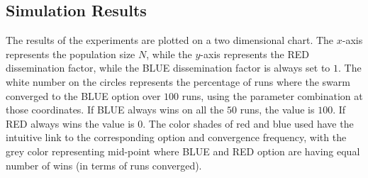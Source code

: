 \documentclass[sigconf]{acmart}
\begin{document}
\subsection{Simulation Results}

The results of the experiments are plotted on a two dimensional chart. The $x$-axis represents the population size $N$, while the $y$-axis represents the RED dissemination factor, while the BLUE dissemination factor is always set to $1$. The white number on the circles represents the percentage of runs where the swarm converged to the BLUE option over $100$ runs, using the parameter combination at those coordinates. 
If BLUE always  wins on all the $50$ runs, the value is $100$.  If RED always wins the value is $0$. 
The color shades of red and blue used have the intuitive link to the corresponding option and convergence frequency, with the grey color representing mid-point where BLUE and RED option are having equal number of wins (in terms of runs converged). 




   
\end{document}
